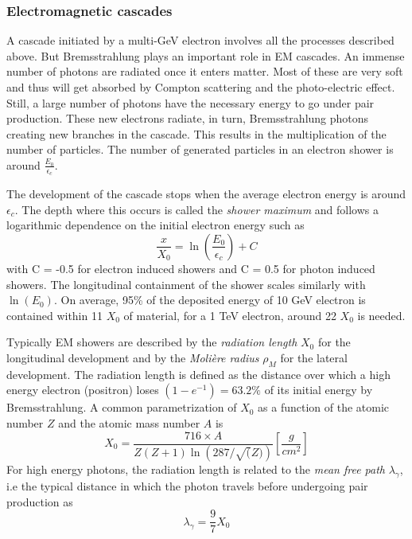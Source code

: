 \subsubsection{Electromagnetic cascades}
\label{subsubsec:EMcascade}

A cascade initiated by a multi-GeV electron involves all the processes described above. But Bremsstrahlung plays an important role in EM cascades. An immense number of photons are radiated once it enters matter. Most of these are very soft and thus will get absorbed by Compton scattering and the photo-electric effect. Still, a large number of photons have the necessary energy to go under pair production. These new electrons radiate, in turn, Bremsstrahlung photons creating new branches in the cascade. This results in the multiplication of the number of particles. The number of generated particles in an electron shower is around $\frac{E_0}{\epsilon_{c}}$.

The development of the cascade stops when the average electron energy is around $\epsilon_{c}$. The depth where this occurs is called the \textit{shower maximum} and follows a logarithmic dependence on the initial electron energy such as \cite{Wigmans:392793}
\begin{equation}
  \frac{x}{X_0} = \ln\left(\frac{E_0}{\epsilon_{c}}\right) + C
\end{equation}
with C = -0.5 for electron induced showers and C = 0.5 for photon induced showers. The longitudinal containment of the shower scales similarly with $\ln\left(E_0\right)$. On average, 95\% of the deposited energy of 10 GeV electron is contained within 11 $X_0$ of material, for a 1 TeV electron, around 22 $X_0$ is needed.

Typically EM showers are described by the \textit{radiation length} $X_0$ for the longitudinal development and by the \textit{Moli\`ere radius} $\rho_{M}$ for the lateral development. The radiation length is defined as the distance over which a high energy electron (positron) loses $(1 - e^{-1}) = 63.2\%$ of its initial energy by Bremsstrahlung. A common parametrization of $X_0$ as a function of the atomic number $Z$ and the atomic mass number $A$ is \cite{Wigmans:392793}
\begin{equation}
  X_0 = \frac{716 \times A}{Z(Z+1)\ln\left(287/\sqrt(Z)\right)} [\frac{g}{cm^2}]
\end{equation}
For high energy photons, the radiation length is related to the \textit{mean free path} $\lambda_{\gamma}$, i.e the typical distance in which the photon travels before undergoing pair production as
\begin{equation}
  \lambda_{\gamma} = \frac{9}{7} X_0
\end{equation}

